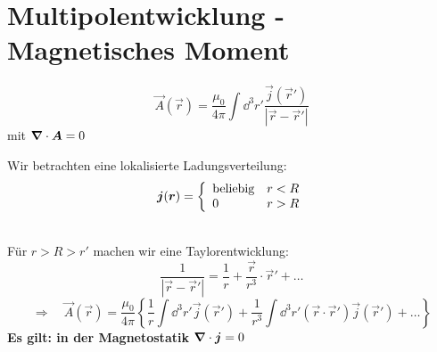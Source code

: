 \section{Multipolentwicklung - Magnetisches Moment}

\begin{equation*}
\vec{A}(\vec{r}) = \frac{\mu_0}{4 \pi} \int \dd ^3 r' \frac{\vec{j}(\vec{r}')}{|\vec{r} - \vec{r}'|}
\end{equation*}
mit $ \bm{\nabla} \cdot \bm{A} = 0 $\\
\begin{minipage}{.5\linewidth}
	Wir betrachten eine lokalisierte Ladungsverteilung:
	\begin{equation*}
	\bm{j}(\bm{r}) = \left\{ \begin{array}{ll} {\textrm{beliebig}} & {r < R} \\ {0} & {r > R} \end{array} \right.
	\end{equation*}
\end{minipage}%
\begin{minipage}{.5\linewidth}
	\flushright
\end{minipage}%
\\
Für $ r > R > r' $ machen wir eine Taylorentwicklung:
\begin{equation*}
\frac{1}{|\vec{r} - \vec{r}'|} = \frac{1}{r} + \frac{\vec{r}}{r^3} \cdot \vec{r}' + \dots
\end{equation*}
\begin{equation*}
\Rightarrow \quad \vec{A}(\vec{r}) = \frac{\mu_0}{4 \pi} \left\{\frac{1}{r} \int \dd^3r' \vec{j} (\vec{r}') + \frac{1}{r^3} \int \dd ^3 r' (\vec{r} \cdot \vec{r}') \vec{j}(\vec{r}') + \dots \right\}
\end{equation*}
\textbf{Es gilt: in der Magnetostatik} $ \bm{\nabla} \cdot \bm{j} = 0 $
